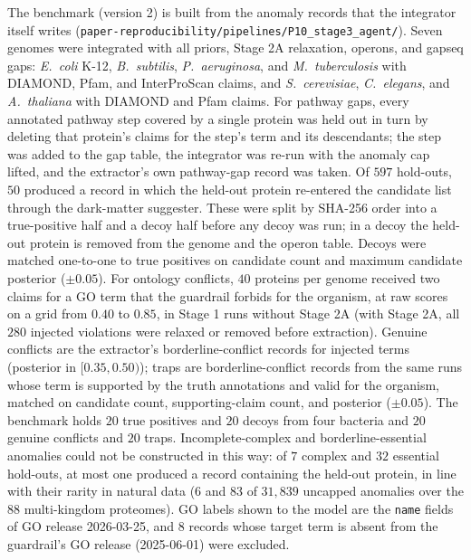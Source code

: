 \documentclass[10pt]{article}
\newcommand{\fn}[1]{\nolinkurl{#1}}
\begin{document}
The benchmark (version 2) is built from the anomaly records that the integrator itself writes (\fn{paper-reproducibility/pipelines/P10_stage3_agent/}). Seven genomes were integrated with all priors, Stage 2A relaxation, operons, and gapseq gaps: \textit{E.~coli} K-12, \textit{B.~subtilis}, \textit{P.~aeruginosa}, and \textit{M.~tuberculosis} with DIAMOND, Pfam, and InterProScan claims, and \textit{S.~cerevisiae}, \textit{C.~elegans}, and \textit{A.~thaliana} with DIAMOND and Pfam claims. For pathway gaps, every annotated pathway step covered by a single protein was held out in turn by deleting that protein's claims for the step's term and its descendants; the step was added to the gap table, the integrator was re-run with the anomaly cap lifted, and the extractor's own pathway-gap record was taken. Of $597$ hold-outs, $50$ produced a record in which the held-out protein re-entered the candidate list through the dark-matter suggester. These were split by SHA-256 order into a true-positive half and a decoy half before any decoy was run; in a decoy the held-out protein is removed from the genome and the operon table. Decoys were matched one-to-one to true positives on candidate count and maximum candidate posterior ($\pm 0.05$). For ontology conflicts, $40$ proteins per genome received two claims for a GO term that the guardrail forbids for the organism, at raw scores on a grid from $0.40$ to $0.85$, in Stage 1 runs without Stage 2A (with Stage 2A, all $280$ injected violations were relaxed or removed before extraction). Genuine conflicts are the extractor's borderline-conflict records for injected terms (posterior in $[0.35, 0.50)$); traps are borderline-conflict records from the same runs whose term is supported by the truth annotations and valid for the organism, matched on candidate count, supporting-claim count, and posterior ($\pm 0.05$). The benchmark holds $20$ true positives and $20$ decoys from four bacteria and $20$ genuine conflicts and $20$ traps. Incomplete-complex and borderline-essential anomalies could not be constructed in this way: of $7$ complex and $32$ essential hold-outs, at most one produced a record containing the held-out protein, in line with their rarity in natural data ($6$ and $83$ of $31{,}839$ uncapped anomalies over the 88 multi-kingdom proteomes). GO labels shown to the model are the \texttt{name} fields of GO release 2026-03-25, and $8$ records whose target term is absent from the guardrail's GO release (2025-06-01) were excluded.
\end{document}
